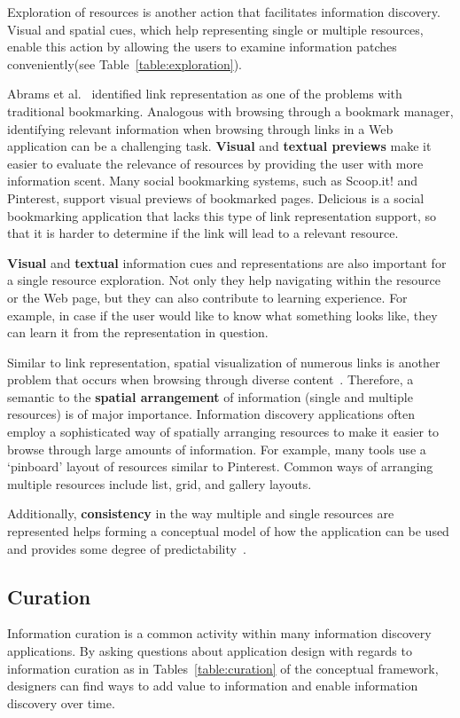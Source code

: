 {{Exploration of resources is another action that facilitates information discovery. Visual and spatial cues, which help representing single or multiple resources, enable this action by allowing the users to examine information patches conveniently(see Table~\ref{table:exploration}). 

Abrams et al.~\cite{abrams1998information} identified link representation as one of the problems with traditional bookmarking. Analogous with browsing through a bookmark manager, identifying relevant information when browsing through links in a Web application can be a challenging task. \textbf{Visual} and \textbf{textual previews} make it easier to evaluate the relevance of resources by providing the user with more information scent. Many social bookmarking systems, such as Scoop.it! and Pinterest, support visual previews of bookmarked pages. Delicious is a social bookmarking application that lacks this type of link representation support, so that it is harder to determine if the link will lead to a relevant resource.

\textbf{Visual} and \textbf{textual} information cues and representations are also important for a single resource exploration. Not only they help navigating within the resource or the Web page, but they can also contribute to learning experience. For example, in case if the user would like to know what something looks like, they can learn it from the representation in question.  

Similar to link representation, spatial visualization of numerous links is another problem that occurs when browsing through diverse content~\cite{abrams1998information}. Therefore, a semantic to the \textbf{spatial arrangement} of information (single and multiple resources) is of major importance. Information discovery applications often employ a sophisticated way of spatially arranging resources to make it easier to browse through large amounts of information. For example, many tools use a `pinboard' layout of resources similar to Pinterest. Common ways of arranging multiple resources include list, grid, and gallery layouts. 

Additionally, \textbf{consistency} in the way multiple and single resources are represented helps forming a conceptual model of how the application can be used and provides some degree of predictability~\cite{norman2002design}.
} %

{\subsection{Curation}
Information curation is a common activity within many information discovery applications. By asking questions about application design with regards to information curation as in Tables~\ref{table:curation} of the conceptual framework, designers can find ways to add value to information and enable information discovery over time.

}}
